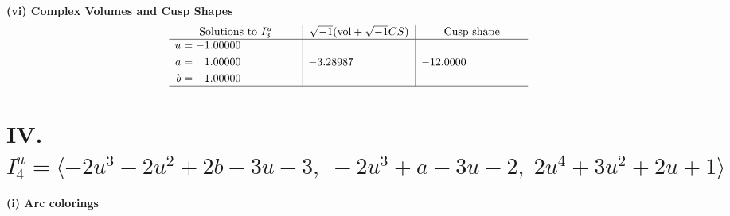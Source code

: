 \documentclass[1p]{elsarticle_modified}
\theoremstyle{definition}
\newcommand{\I}{\sqrt{-1}}
\begin{document}
\newpage\flushleft \textbf{(vi) Complex Volumes and Cusp Shapes}
$$\begin{array}{c|c|c}  
\text{Solutions to }I^u_{3}& \I (\text{vol} + \sqrt{-1}CS) & \text{Cusp shape}\\
 \hline 
\begin{aligned}
u &= -1.00000\phantom{ +0.000000I} \\
a &= \phantom{-}1.00000\phantom{ +0.000000I} \\
b &= -1.00000\phantom{ +0.000000I}\end{aligned}
 & -3.28987\phantom{ +0.000000I} & -12.0000\phantom{ +0.000000I}\\
 \hline 
 \end{array}$$\newpage\newpage\renewcommand{\arraystretch}{1}
\centering \section*{IV. $I^u_{4}= \langle -2 u^3-2 u^2+2 b-3 u-3,\;-2 u^3+a-3 u-2,\;2 u^4+3 u^2+2 u+1 \rangle$}
\flushleft \textbf{(i) Arc colorings}\\
\end{document}
